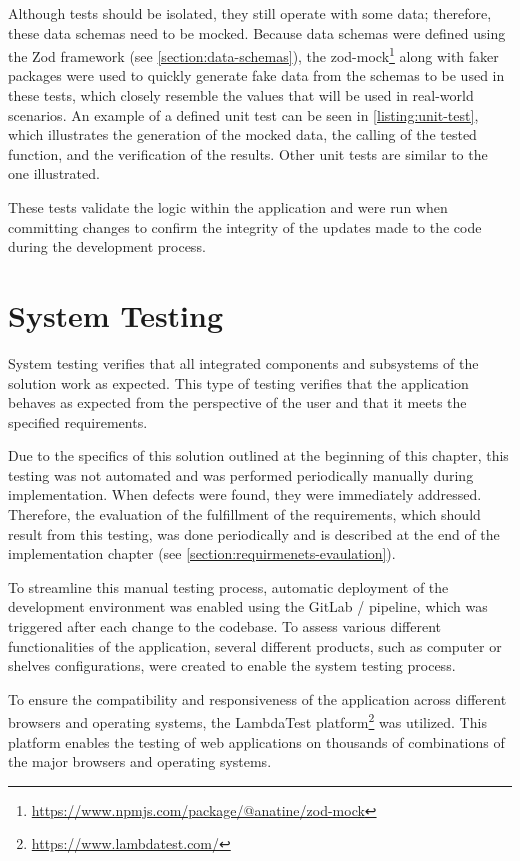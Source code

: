 Although tests should be isolated, they still operate with some data; therefore, these data schemas need to be mocked. Because data schemas were defined using the Zod framework (see \autoref{section:data-schemas}), the zod-mock\footnote{\url{https://www.npmjs.com/package/@anatine/zod-mock}} along with faker packages were used to quickly generate fake data from the schemas to be used in these tests, which closely resemble the values that will be used in real-world scenarios. An example of a defined unit test can be seen in \autoref{listing:unit-test}, which illustrates the generation of the mocked data, the calling of the tested function, and the verification of the results. Other unit tests are similar to the one illustrated.

These tests validate the logic within the application and were run when committing changes to confirm the integrity of the updates made to the code during the development process.

\section{System Testing}

System testing verifies that all integrated components and subsystems of the solution work as expected. This type of testing verifies that the application behaves as expected from the perspective of the user and that it meets the specified requirements.~\cite{Stephens2023}

Due to the specifics of this solution outlined at the beginning of this chapter, this testing was not automated and was performed periodically manually during implementation. When defects were found, they were immediately addressed. Therefore, the evaluation of the fulfillment of the requirements, which should result from this testing, was done periodically and is described at the end of the implementation chapter (see \autoref{section:requirmenets-evaulation}).

To streamline this manual testing process, automatic deployment of the development environment was enabled using the GitLab / pipeline, which was triggered after each change to the codebase. To assess various different functionalities of the application, several different products, such as computer or shelves configurations, were created to enable the system testing process. 

To ensure the compatibility and responsiveness of the application across different browsers and operating systems, the LambdaTest platform\footnote{\url{https://www.lambdatest.com/}} was utilized. This platform enables the testing of web applications on thousands of combinations of the major browsers and operating systems.~\cite{LambdaTest}

